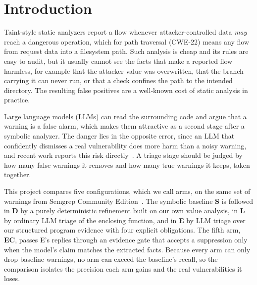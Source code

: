 \section{Introduction}

Taint-style static analyzers report a flow whenever attacker-controlled data \emph{may} reach a dangerous operation, which for path traversal (CWE-22) means any flow from request data into a filesystem path. Such analysis is cheap and its rules are easy to audit, but it usually cannot see the facts that make a reported flow harmless, for example that the attacker value was overwritten, that the branch carrying it can never run, or that a check confines the path to the intended directory. The resulting false positives are a well-known cost of static analysis in practice.

Large language models (LLMs) can read the surrounding code and argue that a warning is a false alarm, which makes them attractive as a second stage after a symbolic analyzer. The danger lies in the opposite error, since an LLM that confidently dismisses a real vulnerability does more harm than a noisy warning, and recent work reports this risk directly~\cite{sifting2026}. A triage stage should be judged by how many false warnings it removes and how many true warnings it keeps, taken together.

This project compares five configurations, which we call arms, on the same set of warnings from Semgrep Community Edition~\cite{semgrep}. The symbolic baseline \textbf{S} is followed in \textbf{D} by a purely deterministic refinement built on our own value analysis, in \textbf{L} by ordinary LLM triage of the enclosing function, and in \textbf{E} by LLM triage over our structured program evidence with four explicit obligations. The fifth arm, \textbf{EC}, passes E's replies through an evidence gate that accepts a suppression only when the model's claim matches the extracted facts. Because every arm can only drop baseline warnings, no arm can exceed the baseline's recall, so the comparison isolates the precision each arm gains and the real vulnerabilities it loses.

